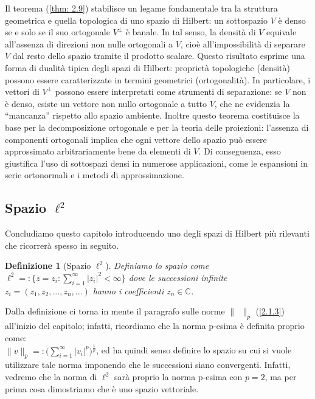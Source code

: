 \documentclass[a4paper,12pt]{report}
\newtheorem{definizione}{Definizione}[chapter]
\newcommand{\lt}{<}
\begin{document}
Il teorema (\ref{thm: 2.9}) stabilisce un legame fondamentale tra la struttura geometrica e quella topologica di uno spazio di Hilbert: un sottospazio \(V\) è denso se e solo se il suo ortogonale \(V^\perp\) è banale. In tal senso, la densità di \(V\) equivale all’assenza di direzioni non nulle ortogonali a \(V\), cioè all’impossibilità di separare \(V\) dal resto dello spazio tramite il prodotto scalare. Questo risultato esprime una forma di dualità tipica degli spazi di Hilbert: proprietà topologiche (densità) possono essere caratterizzate in termini geometrici (ortogonalità). In particolare, i vettori di \(V^\perp\) possono essere interpretati come strumenti di separazione: se \(V\) non è denso, esiste un vettore non nullo ortogonale a tutto \(V\), che ne evidenzia la “mancanza” rispetto allo spazio ambiente. Inoltre questo teorema costituisce la base per la decomposizione ortogonale e per la teoria delle proiezioni: l’assenza di componenti ortogonali implica che ogni vettore dello spazio può essere approssimato arbitrariamente bene da elementi di \(V\). Di conseguenza, esso giustifica l’uso di sottospazi densi in numerose applicazioni, come le espansioni in serie ortonormali e i metodi di approssimazione.

\subsection{Spazio $\ell^2$}\label{sec: 2.2.5}

Concludiamo questo capitolo introducendo uno degli spazi di Hilbert più rilevanti che ricorrerà spesso in seguito. 
\\
\begin{definizione}[Spazio $\ell^2$]
    Definiamo lo spazio come $\ell^2=:\bigg\{z=z_i: \displaystyle\sum_{i=1}^\infty |z_i|^2\lt \infty \bigg\}$ dove le successioni infinite $z_i=(z_1,z_2,...,z_n,...)$ hanno i coefficienti $z_n \in \mathbb{C}$.
\end{definizione}

\vspace{0.5cm}

Dalla definizione ci torna in mente il paragrafo sulle norme $\| \ \ \|_p$ (\ref{2.1.3}) all'inizio del capitolo; infatti, ricordiamo che la norma p-esima è definita proprio come:
\\$\|v\|_p=:\bigg(\displaystyle\sum_{i=1}^\infty |v_i|^p\bigg)^{\frac{1}{p}}$, ed ha quindi senso definire lo spazio su cui si vuole utilizzare tale norma imponendo che le successioni siano convergenti. Infatti, vedremo che la norma di $\ell^2$ sarà proprio la norma p-esima con $p=2$, ma per prima cosa dimostriamo che è uno spazio vettoriale. 
\end{document}
